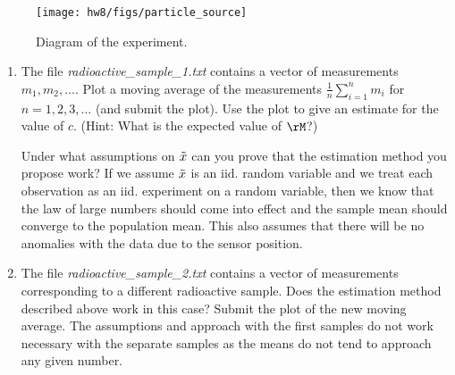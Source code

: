 \documentclass[12pt,twoside]{article}
\newcommand{\rnd}{\Tilde  }
\newcommand{\rx}{\rnd{ x}  }
\begin{document}
\begin{enumerate}
\begin{figure}[htbp]
\centering
\texttt{[image: hw8/figs/particle\_source]} 
\caption{Diagram of the experiment.}
\label{fig:particle_source}
\end{figure}

\begin{enumerate}
\item The file \emph{radioactive\_sample\_1.txt} contains a vector of measurements $m_1,m_2, \dots$. Plot a moving average of the measurements $\frac{1}{n}\sum_{i=1}^{n} m_i$ for $n=1,2,3,\ldots$ (and submit the plot). Use the plot to give an estimate for the value of $c$. (Hint: What is the expected value of $\rM$?) 

Under what assumptions on $\rx$ can you prove that the estimation method you propose work?
\subitem If we assume $\rx$ is an iid. random variable and we treat each observation as an iid. experiment on a random variable, then we know that the law of large numbers should come into effect and the sample mean should converge to the population mean. This also assumes that there will be no anomalies with the data due to the sensor position.

\item The file \emph{radioactive\_sample\_2.txt} contains a vector of measurements corresponding to a different radioactive sample. Does the estimation method described above work in this case? Submit the plot of the new moving average.
\subitem The assumptions and approach with the first samples do not work necessary with the separate samples as the means do not tend to approach any given number.


\end{enumerate}
\end{enumerate}
\end{document}
